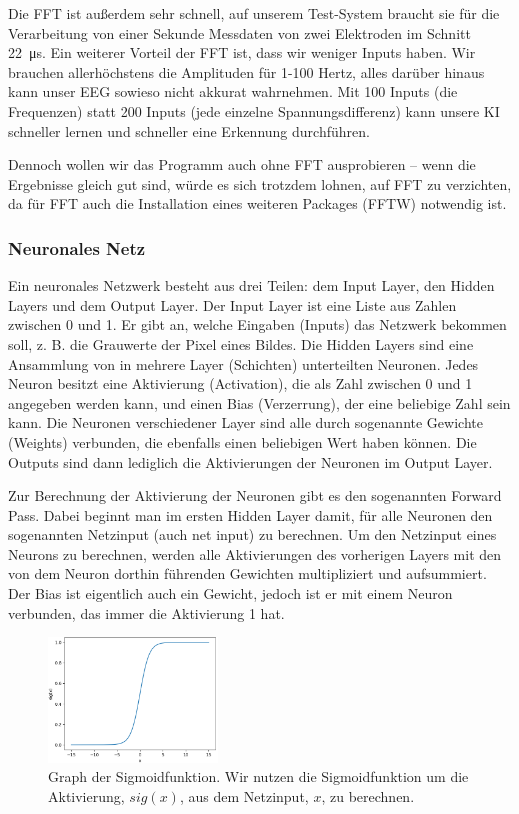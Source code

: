 \documentclass[11pt]{scrartcl}
\begin{document}
	Die FFT ist außerdem sehr schnell, auf unserem Test-System braucht sie für die Verarbeitung von einer Sekunde Messdaten von zwei Elektroden im Schnitt \qty{22}{\micro\second}. Ein weiterer Vorteil der FFT ist, dass wir weniger Inputs haben. Wir brauchen allerhöchstens die Amplituden für 1-100 Hertz, alles darüber hinaus kann unser EEG sowieso nicht akkurat wahrnehmen. Mit 100 Inputs (die Frequenzen) statt 200 Inputs (jede einzelne Spannungsdifferenz) kann unsere KI schneller lernen und schneller eine Erkennung durchführen.

	Dennoch wollen wir das Programm auch ohne FFT ausprobieren -- wenn die Ergebnisse gleich gut sind, würde es sich trotzdem lohnen, auf FFT zu verzichten, da für FFT auch die Installation eines weiteren Packages (FFTW) notwendig ist. 

	\subsubsection{Neuronales Netz}

	Ein neuronales Netzwerk besteht aus drei Teilen: dem Input Layer, den Hidden Layers und dem Output Layer. 
	Der Input Layer ist eine Liste aus Zahlen zwischen 0 und 1. Er gibt an, welche Eingaben (Inputs) das Netzwerk bekommen soll, z. B. die Grauwerte der Pixel eines Bildes.
	Die Hidden Layers sind eine Ansammlung von in mehrere Layer (Schichten) unterteilten Neuronen.
	Jedes Neuron besitzt eine Aktivierung (Activation), die als Zahl zwischen 0 und 1 angegeben werden kann, und einen Bias (Verzerrung), der eine beliebige Zahl sein kann. Die Neuronen verschiedener Layer sind alle durch sogenannte Gewichte (Weights) verbunden, die ebenfalls einen beliebigen Wert haben können.
	Die Outputs sind dann lediglich die Aktivierungen der Neuronen im Output Layer.


	Zur Berechnung der Aktivierung der Neuronen gibt es den sogenannten Forward Pass. Dabei beginnt man im ersten Hidden Layer damit, für alle Neuronen den sogenannten Netzinput (auch net input) zu berechnen. Um den Netzinput eines Neurons zu berechnen, werden alle Aktivierungen des vorherigen Layers mit den von dem Neuron dorthin führenden Gewichten multipliziert und aufsummiert. Der Bias ist eigentlich auch ein Gewicht, jedoch ist er mit einem Neuron verbunden, das immer die Aktivierung 1 hat.

	\begin{figure}
		\centering
		\vspace*{-5mm}
		\includegraphics[width=0.4\textwidth]{pictures/sig_func.png}
		\caption{Graph der Sigmoidfunktion. Wir nutzen die Sigmoidfunktion um die Aktivierung, $sig(x)$, aus dem Netzinput, $x$, zu berechnen.}
		\label{sig_func}
	\end{figure}
\end{document}
